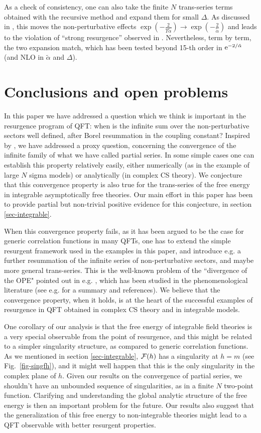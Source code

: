 \documentclass[a4paper,11pt]{article}
\theoremstyle{definition}
\newcommand{\CF}{{\cal F}}
\newcommand{\re}{{\rm e}}
\newcommand{\sectiono}[1]{\section{#1}\setcounter{equation}{0}}
\newcommand{\figref}[1]{Fig.~\protect\ref{#1}}
\begin{document}
As a check of consistency, one can also take the finite $N$ trans-series terms obtained with the recursive method and expand them for small $\Delta$. As discussed in \cite{mmr-an}, this moves the non-perturbative effects $\exp\left(-\frac{2}{\Upsilon\tilde\alpha}\right)\rightarrow\exp\left(-\frac{2}{\tilde\alpha}\right)$ and leads to the violation of ``strong resurgence'' observed in \cite{dmss}. Nevertheless, term by term, the two expansion match, which has been tested beyond 15-th order in $\re^{-2/\tilde\alpha}$ (and NLO in $\tilde{\alpha}$ and $\Delta$).


\sectiono{Conclusions and open problems}

In this paper we have addressed a question which we think is important in the 
resurgence program of QFT: when is the infinite sum over 
the non-perturbative sectors well defined, after Borel resummation in the coupling constant? 
Inspired by \cite{costin-costin}, we have addressed a proxy question, concerning the 
convergence of the infinite family of what we have called partial series. In some simple cases 
one can establish this property relatively easily, either numerically (as in the example of large $N$ 
sigma models) or analytically (in complex CS theory). We conjecture that this convergence 
property is also true for the trans-series of the free energy in integrable asymptotically free theories. Our main effort 
in this paper has been to provide partial but non-trivial 
positive evidence for this conjecture, in section \ref{sec-integrable}. 

When this convergence property fails, as it has been argued to be the case for generic 
correlation functions in many QFTs, one has to extend the simple resurgent framework used 
in the examples in this paper, and 
introduce e.g. a further resummation of the infinite series of non-perturbative sectors, and maybe 
more general trans-series. This is the well-known problem of the ``divergence of the OPE" pointed out in e.g. 
\cite{shifman,shifman-hadrons}, which has been studied in the phenomenological literature 
(see e.g. \cite{peris} for a summary and references). We believe that the convergence property, when it holds, is at the heart of the 
successful examples of resurgence in QFT obtained in complex CS theory and in integrable models. 

One corollary of our analysis is that the free energy of integrable field theories is a 
very special observable from the point of resurgence, 
and this might be related to a simpler singularity structure, as compared to generic 
correlation functions. As we mentioned in section \ref{sec-integrable}, $\CF(h)$ has a 
singularity at $h=m$ (see \figref{fig-singfh}), and it might well 
happen that this is the only singularity in the complex plane of $h$. Given our results on the 
convergence of partial series, 
we shouldn't have an unbounded 
sequence of singularities, as in a finite $N$ two-point function. Clarifying and understanding the global analytic structure of the 
free energy is then an important problem for the future. Our results also suggest that the generalization 
of this free energy to non-integrable theories might lead to a QFT observable with better resurgent properties. 
\end{document}
